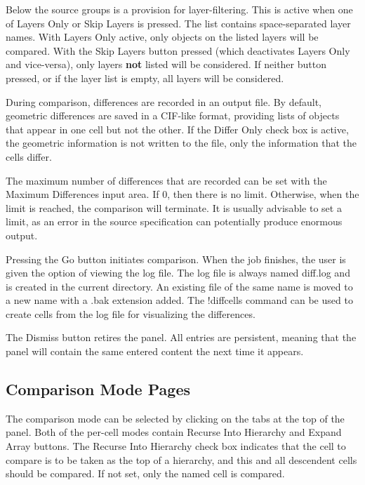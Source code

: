 Below the source groups is a provision for layer-filtering.  This is
active when one of {\cb Layers Only} or {\cb Skip Layers} is pressed. 
The list contains space-separated layer names.  With {\cb Layers Only}
active, only objects on the listed layers will be compared.  With the
{\cb Skip Layers} button pressed (which deactivates {\cb Layers Only}
and vice-versa), only layers {\bf not} listed will be considered.  If
neither button pressed, or if the layer list is empty, all layers will
be considered.

During comparison, differences are recorded in an output file.  By
default, geometric differences are saved in a CIF-like format,
providing lists of objects that appear in one cell but not the other. 
If the {\cb Differ Only} check box is active, the geometric
information is not written to the file, only the information that the
cells differ.

The maximum number of differences that are recorded can be set with
the {\cb Maximum Differences} input area.  If 0, then there is no
limit.  Otherwise, when the limit is reached, the comparison will
terminate.  It is usually advisable to set a limit, as an error in the
source specification can potentially produce enormous output.

Pressing the {\cb Go} button initiates comparison.  When the job
finishes, the user is given the option of viewing the log file.  The
log file is always named {\vt diff.log} and is created in the current
directory.  An existing file of the same name is moved to a new name
with a {\vt .bak} extension added.  The {\cb !diffcells} command can
be used to create cells from the log file for visualizing the
differences.

The {\cb Dismiss} button retires the panel.  All entries are
persistent, meaning that the panel will contain the same entered
content the next time it appears.

\subsection{Comparison Mode Pages}

The comparison mode can be selected by clicking on the tabs at the top
of the panel.  Both of the per-cell modes contain {\cb Recurse Into
Hierarchy} and {\cb Expand Array} buttons.  The {\cb Recurse Into
Hierarchy} check box indicates that the cell to compare is to be taken
as the top of a hierarchy, and this and all descendent cells should be
compared.  If not set, only the named cell is compared.

